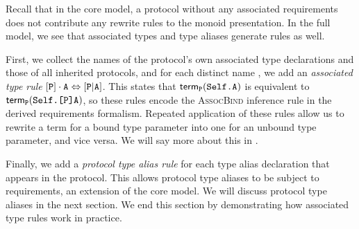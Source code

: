 \documentclass[../generics]{subfiles}
\begin{document}
Recall that in the core model, a protocol without any associated requirements does not contribute any rewrite rules to the monoid presentation. In the full model, we see that associated types and type aliases generate rules as well.

First, we collect the names of the protocol's own associated type declarations and those of all inherited protocols, and for each distinct name \nA, we add an \emph{associated type rule} $[\texttt{P}]\cdot\texttt{A} \Leftrightarrow [\texttt{P}|\texttt{A}]$. This states that $\mathsf{term}_{\texttt{P}}(\texttt{Self.A})$ is equivalent to $\mathsf{term}_{\texttt{P}}(\texttt{Self.[P]A})$, so these rules encode the \textsc{AssocBind} inference rule in the derived requirements formalism. Repeated application of these rules allow us to rewrite a term for a bound type parameter into one for an unbound type parameter, and vice versa. We will say more about this in .

Finally, we add a \emph{protocol type alias rule} for each type alias declaration that appears in the protocol. This allows protocol type aliases to be subject to requirements, an extension of the core model. We will discuss protocol type aliases in the next section. We end this section by demonstrating how associated type rules work in practice.
\end{document}
